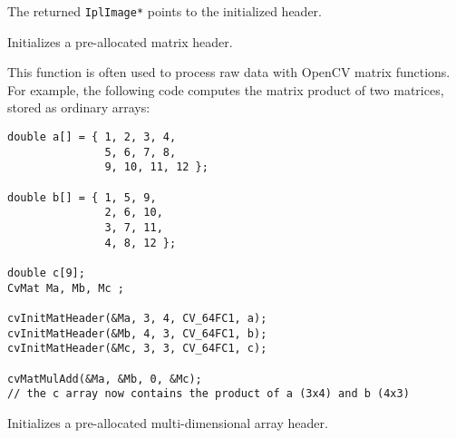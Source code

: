The returned \texttt{IplImage*} points to the initialized header.

Initializes a pre-allocated matrix header.


\begin{description}
\end{description}

This function is often used to process raw data with OpenCV matrix functions. For example, the following code computes the matrix product of two matrices, stored as ordinary arrays:

\begin{lstlisting}
double a[] = { 1, 2, 3, 4,
               5, 6, 7, 8,
               9, 10, 11, 12 };

double b[] = { 1, 5, 9,
               2, 6, 10,
               3, 7, 11,
               4, 8, 12 };

double c[9];
CvMat Ma, Mb, Mc ;

cvInitMatHeader(&Ma, 3, 4, CV_64FC1, a);
cvInitMatHeader(&Mb, 4, 3, CV_64FC1, b);
cvInitMatHeader(&Mc, 3, 3, CV_64FC1, c);

cvMatMulAdd(&Ma, &Mb, 0, &Mc);
// the c array now contains the product of a (3x4) and b (4x3)

\end{lstlisting}

Initializes a pre-allocated multi-dimensional array header.



